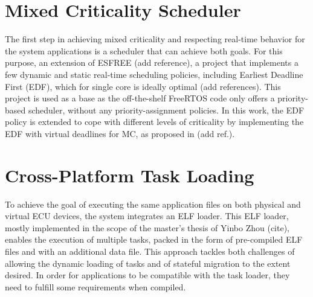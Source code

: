\section{Mixed Criticality Scheduler}

The first step in achieving mixed criticality and respecting real-time behavior for the system applications is a scheduler that can achieve both goals. For this purpose, an extension of ESFREE (add reference), a project that implements a few dynamic and static real-time scheduling policies, including Earliest Deadline First (EDF), which for single core is ideally optimal (add references). This project is used as a base as the off-the-shelf FreeRTOS code only offers a priority-based scheduler, without any priority-assignment policies. In this work, the EDF policy is extended to cope with different levels of criticality by implementing the EDF with virtual deadlines for MC, as proposed in (add ref.).  

\section{Cross-Platform Task Loading}

To achieve the goal of executing the same application files on both physical and virtual ECU devices, the system integrates an ELF loader. This ELF loader, mostly implemented in the scope of the master's thesis of Yinbo Zhou (cite), enables the execution of multiple tasks, packed in the form of pre-compiled ELF files and with an additional data file. This approach tackles both challenges of allowing the dynamic loading of tasks and of stateful migration to the extent desired. In order for applications to be compatible with the task loader, they need to fulfill some requirements when compiled.  
